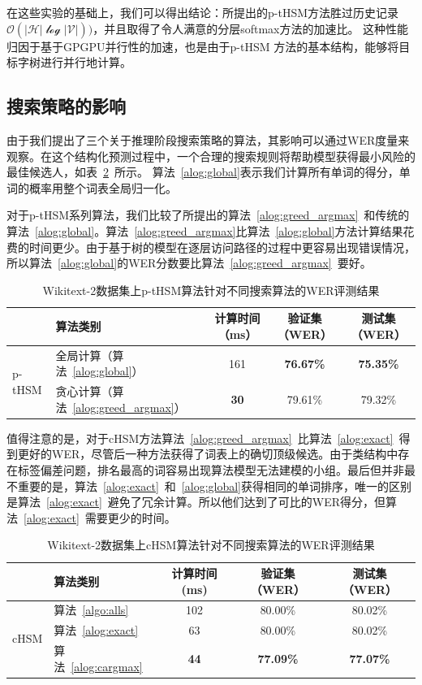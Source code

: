 在这些实验的基础上，我们可以得出结论：所提出的p-tHSM方法胜过历史记录~$\mathcal{O(|H|\log|V|)})$，并且取得了令人满意的分层softmax方法的加速比。 这种性能归因于基于GPGPU并行性的加速，也是由于p-tHSM 方法的基本结构，能够将目标字树进行并行地计算。


\subsection{搜索策略的影响}
由于我们提出了三个关于推理阶段搜索策略的算法，其影响可以通过WER度量来观察。在这个结构化预测过程中，一个合理的搜索规则将帮助模型获得最小风险的最佳候选人，如表~\ref{tab:search}~所示。 算法~\ref{alog:global}表示我们计算所有单词的得分，单词的概率用整个词表全局归一化。

对于p-tHSM系列算法，我们比较了所提出的算法~\ref{alog:greed_argmax}~和传统的算法~\ref{alog:global}。算法~\ref{alog:greed_argmax}比算法~\ref{alog:global}方法计算结果花费的时间更少。由于基于树的模型在逐层访问路径的过程中更容易出现错误情况，所以算法~\ref{alog:global}的WER分数要比算法~\ref{alog:greed_argmax}~要好。
\begin{table}[!ht]
  \centering
  \caption{Wikitext-2数据集上p-tHSM算法针对不同搜索算法的WER评测结果\label{tab:psearch2}}
\begin{tabular}{llccc}
  \toprule
        & 算法类别&计算时间（ms）&验证集（WER）& 测试集（WER）\\ \midrule
  \multirow{2}{*}{p-tHSM}  &全局计算（算法~\ref{alog:global}）&161& \textbf{76.67\%}&\textbf{75.35\%}\\
        &贪心计算（算法~\ref{alog:greed_argmax}）&\textbf{30} & 79.61\%&79.32\%\\
  \bottomrule
\end{tabular}
\end{table}

值得注意的是，对于cHSM方法算法~\ref{alog:greed_argmax}~比算法~\ref{alog:exact}~得到更好的WER，尽管后一种方法获得了词表上的确切顶级候选。由于类结构中存在标签偏差问题，排名最高的词容易出现算法模型无法建模的小组。最后但并非最不重要的是，算法~\ref{alog:exact}~和~\ref{alog:global}获得相同的单词排序，唯一的区别是算法~\ref{alog:exact}~避免了冗余计算。所以他们达到了可比的WER得分，但算法~\ref{alog:exact}~需要更少的时间。

\begin{table}[!ht]
  \centering
  \caption{Wikitext-2数据集上cHSM算法针对不同搜索算法的WER评测结果\label{tab:search}}
\begin{tabular}{llccc}
  \toprule
   & 算法类别&计算时间 (ms)&验证集（WER）& 测试集（WER）\\ \midrule
  \multirow{3}{*}{cHSM} &算法~\ref{algo:alls}&102& 80.00\%& 80.02\%\\
        &算法~\ref{alog:exact}&63& 80.00\%& 80.02\%\\
        &算法~\ref{alog:cargmax}&\textbf{44}&\textbf{ 77.09\%}&\textbf{ 77.07\%}\\
  \bottomrule
\end{tabular}
\end{table}


